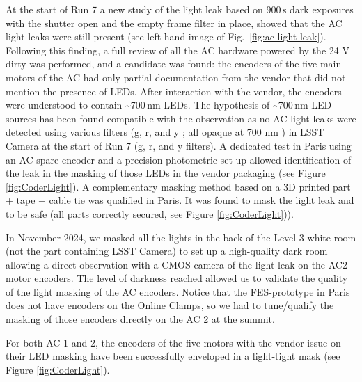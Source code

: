 At the start of Run 7 a new study of the light leak based on 900\,s
dark exposures with the shutter open and the empty frame filter in
place, showed that the AC light leaks were still present (see left-hand image of Fig.~\ref{fig:ac-light-leak}). Following this finding, a full review of all the AC hardware powered
by the 24 V dirty was performed, and a candidate was found: the encoders
of the five main motors of the AC had only partial documentation from the
vendor that did not mention the presence of LEDs. After interaction with the
vendor, the encoders were understood to contain \textasciitilde700\,nm LEDs. The hypothesis of \textasciitilde700\,nm LED sources has been
found compatible with the observation as no AC light leaks were detected
using various filters (g, r, and y ; all opaque at 700 nm ) in LSST Camera at the start of Run 7 (g, r, and y
filters). A dedicated test in Paris using an AC spare encoder and a
precision photometric set-up allowed identification of the leak in the masking of
those LEDs in the vendor packaging (see Figure \ref{fig:CoderLight}). A complementary masking method based
on a 3D printed part + tape + cable tie was qualified in Paris.  It was
found to mask the light leak and to be safe (all parts correctly secured, see Figure \ref{fig:CoderLight})).

In November 2024, we masked all the lights in the back of the Level 3 white
room (not the part containing LSST Camera) to set up a high-quality dark room
allowing a direct observation with a CMOS camera of the light leak on
the AC2 motor encoders. The level of darkness reached allowed us to
validate the quality of the light masking of the AC encoders. Notice that the
FES-prototype in Paris does not have encoders on the Online
Clamps, so we had to tune/qualify the masking of those encoders directly on the AC 2 at the summit.

For both AC 1 and 2, the encoders of the five motors with the vendor issue on
their LED masking have been successfully enveloped in a light-tight
mask (see Figure \ref{fig:CoderLight}).

